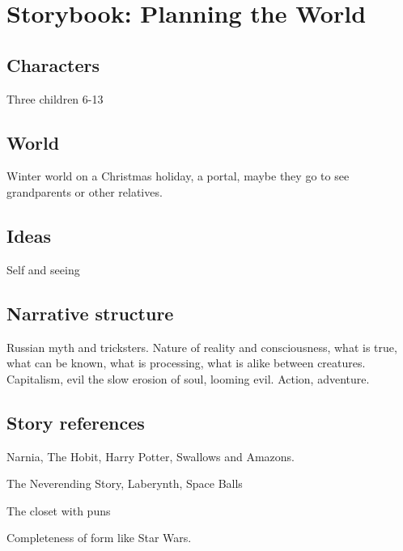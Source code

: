 \documentclass[12pt,openany]{book}      %
\title{\booktitle}
\author{\authorname}
\begin{document}
\frontmatter
% 
% 

\mainmatter
\pagestyle{fancy}






\chapter{Storybook: Planning the World}

\section{Characters}
Three children 6-13

\section{World}
Winter world on a Christmas holiday, a portal, maybe they go to see grandparents or other relatives.

\section{Ideas}
Self and seeing

\section{Narrative structure}
Russian myth and tricksters.
Nature of reality and consciousness, what is true, what can be known, what is processing, what is alike between creatures. 
Capitalism, evil the slow erosion of soul, looming evil. Action, adventure. 

\section{Story references}
Narnia, The Hobit, Harry Potter, Swallows and Amazons.

The Neverending Story, Laberynth, Space Balls

The closet with puns

Completeness of form like Star Wars.


\end{document}
